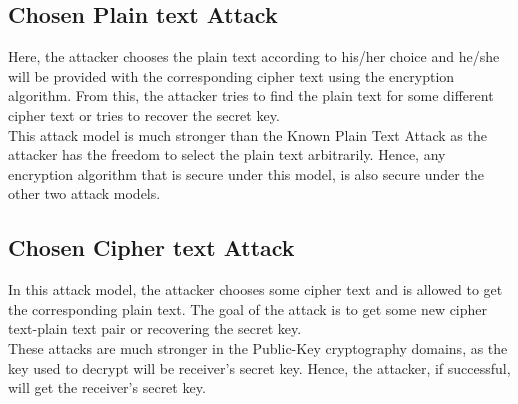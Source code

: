 \documentclass[11pt]{article}
\begin{document}
\subsection{Chosen Plain text Attack}
Here, the attacker chooses the plain text according to his/her choice and he/she will be provided with the corresponding cipher text using the encryption algorithm. From this, the attacker tries to find the plain text for some different cipher text or tries to recover the secret key.\\
\vspace{3mm}
This attack model is much stronger than the Known Plain Text Attack as the attacker has the freedom to select the plain text arbitrarily. Hence, any encryption algorithm that is secure under this model, is also secure under the other two attack models.

\subsection{Chosen Cipher text Attack}
In this attack model, the attacker chooses some cipher text and is allowed to get the corresponding plain text. The goal of the attack is to get some new cipher text-plain text pair or recovering the secret key.\\
\vspace{3mm}
These attacks are much stronger in the Public-Key cryptography domains, as the key used to decrypt will be receiver's secret key. Hence, the attacker, if successful, will get the receiver's secret key.
\end{document}
